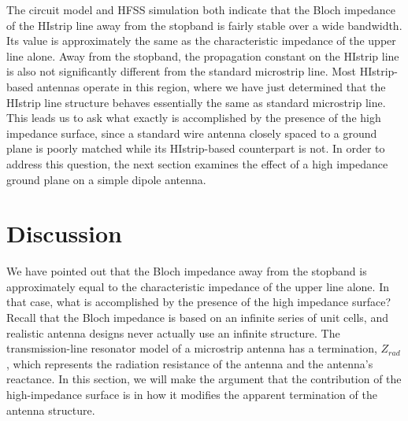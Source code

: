 \documentclass{allertonproc}
\begin{document}
The circuit model and HFSS simulation both indicate that the Bloch impedance of the HIstrip line away from the stopband is fairly stable over a wide bandwidth.  Its value is  approximately the same as the characteristic impedance of the upper line alone. Away from the stopband, the propagation constant on the HIstrip line is also not significantly different from the standard microstrip line.  Most HIstrip-based antennas operate in this region, where we have just determined that the HIstrip line structure behaves essentially the same as standard microstrip line.  This leads us to ask what exactly is accomplished by the presence of the high impedance surface, since a standard wire antenna closely spaced to a ground plane is poorly matched while its HIstrip-based counterpart is not.  In order to address this question, the next section examines the effect of a high impedance ground plane on a simple dipole antenna.
\FloatBarrier

\section{Discussion}
We have pointed out that the Bloch impedance away from the stopband is approximately equal to the characteristic impedance of the upper line alone.  In that case, what is accomplished by the presence of the high impedance surface?  Recall that the Bloch impedance is based on an infinite series of unit cells, and realistic antenna designs never actually use an infinite structure.  The transmission-line resonator model of a microstrip antenna has a termination, $Z_{rad}$, which represents the radiation resistance of the antenna and the antenna's reactance.  In this section, we will make the argument that the contribution of the high-impedance surface is in how it modifies the apparent termination of the antenna structure. 
\end{document}
